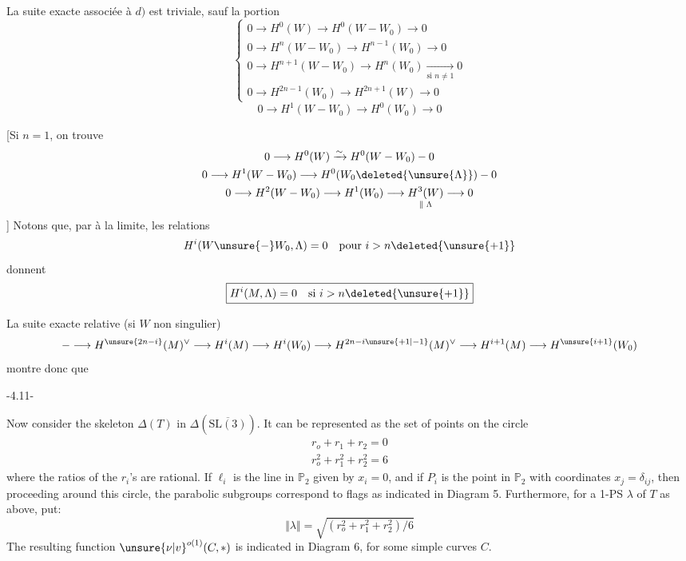 La suite exacte associée à $d)$ est triviale, sauf la portion
\[\left\{\begin{gathered}
0\longrightarrow H^0(W)\longrightarrow H^0(W-W_0)\longrightarrow0\\
0\longrightarrow H^n(W-W_0)\longrightarrow H^{n-1}(W_0)\longrightarrow0\\
0\longrightarrow H^{n+1}(W-W_0)\longrightarrow H^n(W_0)\xrightarrow[\text{si }n\ne1]{}0\\
0\longrightarrow H^{2n-1}(W_0)\longrightarrow H^{2n+1}(W)\longrightarrow0
\end{gathered}\right.\]
\[0\longrightarrow H^1(W-W_0)\longrightarrow H^0(W_0)\longrightarrow0\]
\deleted{\[\unsure{n+1\ne2n+1}\]}
\deleted{\[n+2\ne2n+1\]}

[Si $n=1$, on trouve
\[\begin{gathered}
0\longrightarrow H^0(W)\xrightarrow{\sim}H^0(W-W_0)\mathbin{-}0\\
0\longrightarrow H^1(W-W_0)\longrightarrow H^0(W_0\deleted{\unsure{\Lambda}})\mathbin{-}0\\
0\longrightarrow H^2(W-W_0)\longrightarrow H^1(W_0)\longrightarrow\underset{\Vert\;\Lambda}{H^3(W)}\longrightarrow0
\end{gathered}\]
]
Notons que, par  à la limite,  les relations
\[H^i(W\unsure{-}W_0,\Lambda)=0\quad\text{pour }i>n\deleted{\unsure{+1}}\]
donnent
\[\boxed{H^i(M,\Lambda)=0\quad\text{si }i>n\deleted{\unsure{+1}}}\]

La suite exacte relative (si $W$ non singulier)
\[\mathbin{-}\longrightarrow H^{\unsure{2n-i}}(M)^\vee\longrightarrow H^i(M)\longrightarrow H^i(W_0)\longrightarrow H^{2n-i\unsure{+1|-1}}(M)^\vee\longrightarrow H^{i+1}(M)\longrightarrow H^{\unsure{i+1}}(W_0)\]
montre donc que

\begin{center}-4.11-\end{center}
Now consider the skeleton $\Delta(T)$ in $\Delta(\overline{\mathrm{SL}(3)})$. It can be represented as the set of points on the circle
\[\begin{gathered}r_o+r_1+r_2=0\\r_o^2+r_1^2+r_2^2=6\end{gathered}\]
where the ratios of the $r_i$'s are rational. If $\ell_i$ is the line in $\mathbb P_2$ given by $x_i=0$, and if $P_i$ is the point in $\mathbb P_2$ with coordinates $x_j=\delta_{ij}$, then proceeding around this circle, the parabolic subgroups correspond to flags as indicated in Diagram 5. Furthermore, for a 1-PS $\lambda$ of $T$ as above, put:
\[\Vert\lambda\Vert=\sqrt{(r_o^2+r_1^2+r_2^2)/6}\]
The resulting function $\unsure{\nu|v}^{o(1)}(C,*)$ is indicated in Diagram 6, for some simple curves $C$.

